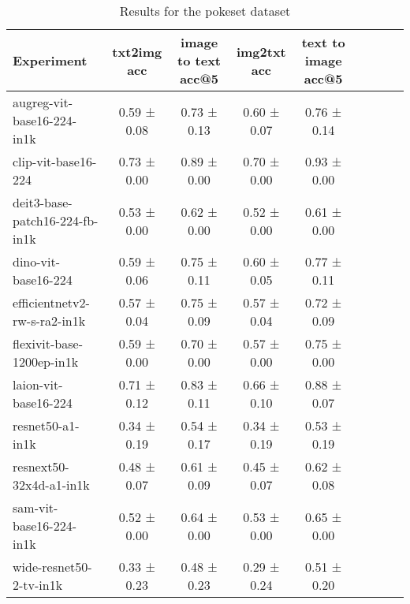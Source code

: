 \begin{table}[htbp]
\caption{Results for the pokeset dataset}
\begin{tabular}{|l|c|c|c|c|c|c|c|c|}\hline
Experiment & txt2img acc & image to text acc@5 & img2txt acc & text to image acc@5\\
\hline
augreg-vit-base16-224-in1k & 0.59 ± 0.08 & 0.73 ± 0.13 & 0.60 ± 0.07 & 0.76 ± 0.14\\
\hline
clip-vit-base16-224 & 0.73 ± 0.00 & 0.89 ± 0.00 & 0.70 ± 0.00 & 0.93 ± 0.00\\
\hline
deit3-base-patch16-224-fb-in1k & 0.53 ± 0.00 & 0.62 ± 0.00 & 0.52 ± 0.00 & 0.61 ± 0.00\\
\hline
dino-vit-base16-224 & 0.59 ± 0.06 & 0.75 ± 0.11 & 0.60 ± 0.05 & 0.77 ± 0.11\\
\hline
efficientnetv2-rw-s-ra2-in1k & 0.57 ± 0.04 & 0.75 ± 0.09 & 0.57 ± 0.04 & 0.72 ± 0.09\\
\hline
flexivit-base-1200ep-in1k & 0.59 ± 0.00 & 0.70 ± 0.00 & 0.57 ± 0.00 & 0.75 ± 0.00\\
\hline
laion-vit-base16-224 & 0.71 ± 0.12 & 0.83 ± 0.11 & 0.66 ± 0.10 & 0.88 ± 0.07\\
\hline
resnet50-a1-in1k & 0.34 ± 0.19 & 0.54 ± 0.17 & 0.34 ± 0.19 & 0.53 ± 0.19\\
\hline
resnext50-32x4d-a1-in1k & 0.48 ± 0.07 & 0.61 ± 0.09 & 0.45 ± 0.07 & 0.62 ± 0.08\\
\hline
sam-vit-base16-224-in1k & 0.52 ± 0.00 & 0.64 ± 0.00 & 0.53 ± 0.00 & 0.65 ± 0.00\\
\hline
wide-resnet50-2-tv-in1k & 0.33 ± 0.23 & 0.48 ± 0.23 & 0.29 ± 0.24 & 0.51 ± 0.20\\
\hline
\end{tabular}
\end{table}

